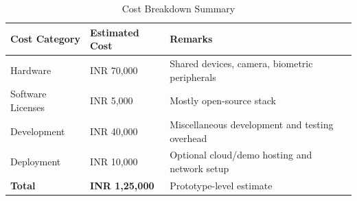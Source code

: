 \begin{table}[htbp]
\centering
\caption{Cost Breakdown Summary}
\begin{tabular}{p{}p{}p{}}
\toprule
Cost Category & Estimated Cost & Remarks \\
\midrule
Hardware & INR 70,000 & Shared devices, camera, biometric peripherals \\
Software Licenses & INR 5,000 & Mostly open-source stack \\
Development & INR 40,000 & Miscellaneous development and testing overhead \\
Deployment & INR 10,000 & Optional cloud/demo hosting and network setup \\
\textbf{Total} & \textbf{INR 1,25,000} & Prototype-level estimate \\
\bottomrule
\end{tabular}
\end{table}

\clearpage

